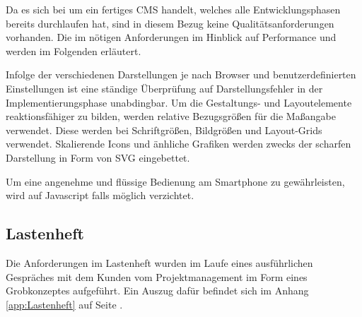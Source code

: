 Da es sich bei \ct um ein fertiges \ac{CMS} handelt, welches alle
Entwicklungsphasen bereits durchlaufen hat, sind in diesem Bezug keine
Qualitätsanforderungen vorhanden. Die im  nötigen
Anforderungen im Hinblick auf Performance und  werden im
Folgenden erläutert.

Infolge der verschiedenen Darstellungen je nach Browser und
benutzerdefinierten Einstellungen ist eine ständige Überprüfung auf
Darstellungsfehler in der Implementierungsphase unabdingbar.
Um die Gestaltungs- und Layoutelemente reaktionsfähiger zu bilden, werden
relative Bezugsgrößen für die Maßangabe verwendet. Diese werden \zB bei
Schriftgrößen, Bildgrößen und Layout-Grids verwendet. Skalierende Icons und 
änhliche Grafiken werden zwecks der scharfen Darstellung in Form von \ac{SVG}
eingebettet.

Um eine angenehme und flüssige Bedienung am Smartphone zu gewährleisten, wird
auf Javascript falls möglich verzichtet.

\subsection{Lastenheft}
\label{sec:Lastenheft}

Die Anforderungen im Lastenheft wurden im Laufe eines ausführlichen Gespräches
mit dem Kunden vom Projektmanagement im Form eines Grobkonzeptes aufgeführt. Ein
Auszug dafür befindet sich im Anhang \ref{app:Lastenheft} auf Seite
\pageref{app:Lastenheft}.

\clearpage
